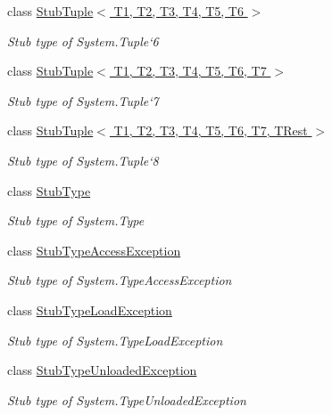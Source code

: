 \begin{DoxyCompactItemize}
class \hyperlink{class_system_1_1_fakes_1_1_stub_tuple_3_01_t1_00_01_t2_00_01_t3_00_01_t4_00_01_t5_00_01_t6_01_4}{Stub\-Tuple$<$ T1, T2, T3, T4, T5, T6 $>$}
\begin{DoxyCompactList}\small\item\em Stub type of System.\-Tuple`6\end{DoxyCompactList}\item 
class \hyperlink{class_system_1_1_fakes_1_1_stub_tuple_3_01_t1_00_01_t2_00_01_t3_00_01_t4_00_01_t5_00_01_t6_00_01_t7_01_4}{Stub\-Tuple$<$ T1, T2, T3, T4, T5, T6, T7 $>$}
\begin{DoxyCompactList}\small\item\em Stub type of System.\-Tuple`7\end{DoxyCompactList}\item 
class \hyperlink{class_system_1_1_fakes_1_1_stub_tuple_3_01_t1_00_01_t2_00_01_t3_00_01_t4_00_01_t5_00_01_t6_00_01_t7_00_01_t_rest_01_4}{Stub\-Tuple$<$ T1, T2, T3, T4, T5, T6, T7, T\-Rest $>$}
\begin{DoxyCompactList}\small\item\em Stub type of System.\-Tuple`8\end{DoxyCompactList}\item 
class \hyperlink{class_system_1_1_fakes_1_1_stub_type}{Stub\-Type}
\begin{DoxyCompactList}\small\item\em Stub type of System.\-Type\end{DoxyCompactList}\item 
class \hyperlink{class_system_1_1_fakes_1_1_stub_type_access_exception}{Stub\-Type\-Access\-Exception}
\begin{DoxyCompactList}\small\item\em Stub type of System.\-Type\-Access\-Exception\end{DoxyCompactList}\item 
class \hyperlink{class_system_1_1_fakes_1_1_stub_type_load_exception}{Stub\-Type\-Load\-Exception}
\begin{DoxyCompactList}\small\item\em Stub type of System.\-Type\-Load\-Exception\end{DoxyCompactList}\item 
class \hyperlink{class_system_1_1_fakes_1_1_stub_type_unloaded_exception}{Stub\-Type\-Unloaded\-Exception}
\begin{DoxyCompactList}\small\item\em Stub type of System.\-Type\-Unloaded\-Exception\end{DoxyCompactList}\item 

\end{DoxyCompactItemize}
